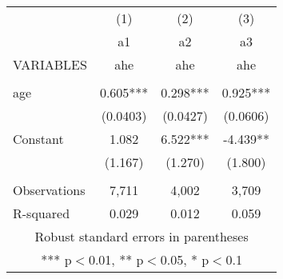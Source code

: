 \documentclass[]{article}
\begin{document}
\begin{tabular}{lccc} \hline
 & (1) & (2) & (3) \\
 & a1 & a2 & a3 \\
VARIABLES & ahe & ahe & ahe \\ \hline
 &  &  &  \\
age & 0.605*** & 0.298*** & 0.925*** \\
 & (0.0403) & (0.0427) & (0.0606) \\
Constant & 1.082 & 6.522*** & -4.439** \\
 & (1.167) & (1.270) & (1.800) \\
 &  &  &  \\
Observations & 7,711 & 4,002 & 3,709 \\
 R-squared & 0.029 & 0.012 & 0.059 \\ \hline
\multicolumn{4}{c}{ Robust standard errors in parentheses} \\
\multicolumn{4}{c}{ *** p$<$0.01, ** p$<$0.05, * p$<$0.1} \\
\end{tabular}
\end{document}
